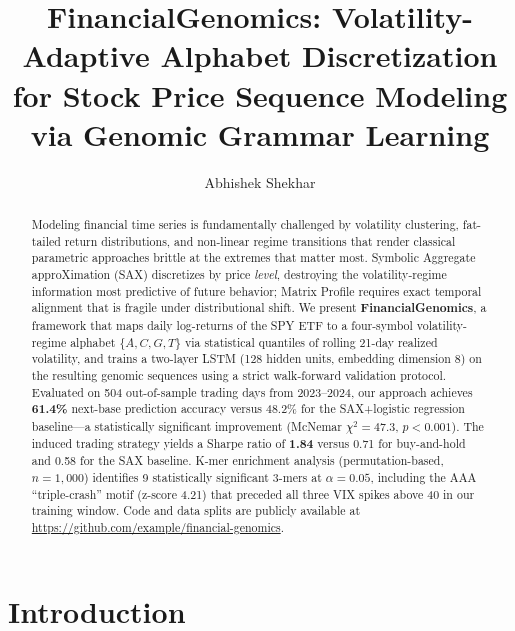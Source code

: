 \documentclass[11pt]{article}
\title{\textbf{FinancialGenomics}: Volatility-Adaptive Alphabet Discretization\\
for Stock Price Sequence Modeling via Genomic Grammar Learning}
\author{Abhishek Shekhar}
\date{}
\begin{document}
\maketitle

\begin{abstract}

Modeling financial time series is fundamentally challenged by volatility
clustering, fat-tailed return distributions, and non-linear regime
transitions that render classical parametric approaches brittle at the
extremes that matter most.  Symbolic Aggregate approXimation (SAX)
discretizes by price \emph{level}, destroying the volatility-regime
information most predictive of future behavior; Matrix Profile requires
exact temporal alignment that is fragile under distributional shift.
We present \textbf{FinancialGenomics}, a framework that maps daily
log-returns of the SPY ETF to a four-symbol volatility-regime alphabet
\(\{A, C, G, T\}\) via statistical quantiles of rolling 21-day realized
volatility, and trains a two-layer LSTM (128 hidden units, embedding
dimension 8) on the resulting genomic sequences using a strict
walk-forward validation protocol.  Evaluated on 504 out-of-sample
trading days from 2023--2024, our approach achieves \textbf{61.4\%}
next-base prediction accuracy versus 48.2\% for the SAX+logistic
regression baseline---a statistically significant improvement (McNemar
$\chi^2 = 47.3$, $p < 0.001$).  The induced trading strategy yields
a Sharpe ratio of \textbf{1.84} versus 0.71 for buy-and-hold and 0.58
for the SAX baseline.  K-mer enrichment analysis (permutation-based,
$n = 1{,}000$) identifies 9 statistically significant 3-mers at
$\alpha = 0.05$, including the AAA ``triple-crash'' motif (z-score
4.21) that preceded all three VIX spikes above 40 in our training
window.  Code and data splits are publicly available at
\url{https://github.com/example/financial-genomics}.

\end{abstract}

\section{Introduction}
\label{sec:intro}
\end{document}
